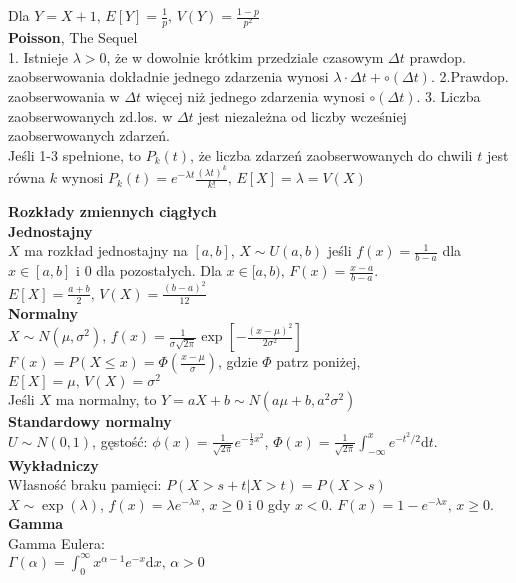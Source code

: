 \documentclass[10pt,landscape,a4paper,notitlepage]{article}
\begin{document}
\begin{multicols*}{4}
        Dla $Y=X+1,\,E[Y]=\frac{1}{p},\,V(Y)=\frac{1-p}{p^2}$\\
        \textbf{Poisson}, The Sequel\\
        1. Istnieje $\lambda>0$, że w dowolnie krótkim przedziale czasowym $\Delta t$ prawdop. zaobserwowania dokładnie jednego zdarzenia wynosi $\lambda\cdot\Delta t+\circ(\Delta t)$.
        2.Prawdop. zaobserwowania w $\Delta t$ więcej niż jednego zdarzenia wynosi $\circ(\Delta t)$.
        3. Liczba zaobserwowanych zd.los. w $\Delta t$ jest niezależna od liczby wcześniej zaobserwowanych zdarzeń.\\
        Jeśli 1-3 spełnione, to $P_k(t)$, że liczba zdarzeń zaobserwowanych do chwili $t$ jest równa $k$ wynosi $P_k(t)=e^{-\lambda t}\frac{(\lambda t)^k}{k!},\,E[X]=\lambda=V(X)$

        \noindent\textbf{\large Rozkłady zmiennych ciągłych}\\
        \textbf{Jednostajny}\\
        $X$ ma rozkład jednostajny na $[a,b],\,X\sim U(a,b)$ jeśli $f(x)=\frac{1}{b-a}$ dla $x\in[a,b]$ i $0$ dla pozostałych.
        Dla $x\in[a,b),\,F(x)=\frac{x-a}{b-a}$.\\
        $E[X]=\frac{a+b}{2},\,V(X)=\frac{(b-a)^2}{12}$\\
        \textbf{Normalny}\\
        $X\sim N(\mu, \sigma^2),\,f(x)=\frac{1}{\sigma\sqrt{2\pi}}\exp\left[-\frac{(x-\mu)^2}{2\sigma^2}\right]$\\
        $F(x)=P(X\leq x)=\Phi(\frac{x-\mu}{\sigma})$, gdzie $\Phi$ patrz poniżej,
        $E[X]=\mu,\,V(X)=\sigma^2$\\
        Jeśli $X$ ma normalny, to $Y=aX+b\sim N(a\mu+b,a^2\sigma^2)$\\
        \textbf{Standardowy normalny}\\
        $U\sim N(0,1)$, gęstość: $\phi(x)=\frac{1}{\sqrt{2\pi}}e^{-\frac{1}{2}x^2}$, $\Phi(x)=\frac{1}{\sqrt{2\pi}}\int_{-\infty}^xe^{-t^2/2}\mathrm{d}t$.\\
        \textbf{Wykładniczy}\\
        Własność braku pamięci: $P(X>s+t|X>t)=P(X>s)$\\
        $X\sim \exp(\lambda)$, $f(x)=\lambda e^{-\lambda x},\,x\geq 0$ i $0$ gdy $x<0$.
        $F(x)=1-e^{-\lambda x},\,x\geq 0$.\\
        \textbf{Gamma}\\
        Gamma Eulera:\\
        $\Gamma(\alpha)=\int_0^{\infty}x^{\alpha-1}e^{-x}\mathrm{d}x,\,\alpha>0$\\

\end{multicols*}
\end{document}
